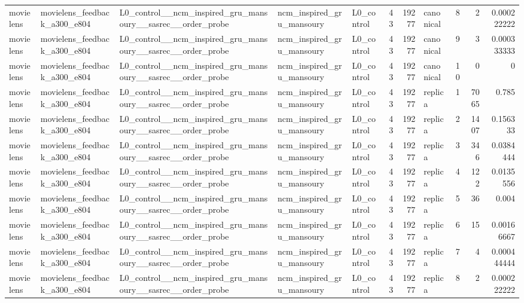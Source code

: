 \begin{table}[htbp!]
\begin{tabular}{lllllrrlrrr}
movielens & movielens\_feedback\_a300\_e804 & L0\_control\_\_ncm\_inspired\_gru\_mansoury\_\_sasrec\_\_order\_probe & ncm\_inspired\_gru\_mansoury & L0\_control & 43 & 19277 & canonical & 8 & 2 & 0.000222222 \\
movielens & movielens\_feedback\_a300\_e804 & L0\_control\_\_ncm\_inspired\_gru\_mansoury\_\_sasrec\_\_order\_probe & ncm\_inspired\_gru\_mansoury & L0\_control & 43 & 19277 & canonical & 9 & 3 & 0.000333333 \\
movielens & movielens\_feedback\_a300\_e804 & L0\_control\_\_ncm\_inspired\_gru\_mansoury\_\_sasrec\_\_order\_probe & ncm\_inspired\_gru\_mansoury & L0\_control & 43 & 19277 & canonical & 10 & 0 & 0 \\
movielens & movielens\_feedback\_a300\_e804 & L0\_control\_\_ncm\_inspired\_gru\_mansoury\_\_sasrec\_\_order\_probe & ncm\_inspired\_gru\_mansoury & L0\_control & 43 & 19277 & replica & 1 & 7065 & 0.785 \\
movielens & movielens\_feedback\_a300\_e804 & L0\_control\_\_ncm\_inspired\_gru\_mansoury\_\_sasrec\_\_order\_probe & ncm\_inspired\_gru\_mansoury & L0\_control & 43 & 19277 & replica & 2 & 1407 & 0.156333 \\
movielens & movielens\_feedback\_a300\_e804 & L0\_control\_\_ncm\_inspired\_gru\_mansoury\_\_sasrec\_\_order\_probe & ncm\_inspired\_gru\_mansoury & L0\_control & 43 & 19277 & replica & 3 & 346 & 0.0384444 \\
movielens & movielens\_feedback\_a300\_e804 & L0\_control\_\_ncm\_inspired\_gru\_mansoury\_\_sasrec\_\_order\_probe & ncm\_inspired\_gru\_mansoury & L0\_control & 43 & 19277 & replica & 4 & 122 & 0.0135556 \\
movielens & movielens\_feedback\_a300\_e804 & L0\_control\_\_ncm\_inspired\_gru\_mansoury\_\_sasrec\_\_order\_probe & ncm\_inspired\_gru\_mansoury & L0\_control & 43 & 19277 & replica & 5 & 36 & 0.004 \\
movielens & movielens\_feedback\_a300\_e804 & L0\_control\_\_ncm\_inspired\_gru\_mansoury\_\_sasrec\_\_order\_probe & ncm\_inspired\_gru\_mansoury & L0\_control & 43 & 19277 & replica & 6 & 15 & 0.00166667 \\
movielens & movielens\_feedback\_a300\_e804 & L0\_control\_\_ncm\_inspired\_gru\_mansoury\_\_sasrec\_\_order\_probe & ncm\_inspired\_gru\_mansoury & L0\_control & 43 & 19277 & replica & 7 & 4 & 0.000444444 \\
movielens & movielens\_feedback\_a300\_e804 & L0\_control\_\_ncm\_inspired\_gru\_mansoury\_\_sasrec\_\_order\_probe & ncm\_inspired\_gru\_mansoury & L0\_control & 43 & 19277 & replica & 8 & 2 & 0.000222222 \\

\end{tabular}
\end{table}
